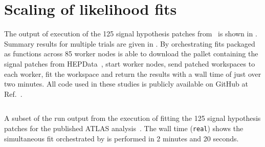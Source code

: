 \section{Scaling of likelihood fits}\label{sec:results}
%
The output of execution of the 125 signal hypothesis patches from~\cite{SUSY-2019-08} is shown in .
Summary results for multiple trials are given in .
By orchestrating \pyhf{} fits packaged as \funcX{} functions across 85 worker nodes \funcX{} is able to download the \pyhf{} pallet containing the signal patches from HEPData~\cite{ATLAS_SUSY_1Lbb_pallet}, start \funcX{} worker nodes, send patched workspaces to each worker, fit the workspace and return the results with a wall time of just over two minutes.
All code used in these studies is publicly available on GitHub at Ref.~\cite{study_code}.
\\

\begin{listing}
 \inputminted{text}{src/code/funcX_demo_output.txt}
 \caption{A subset of the run output from the execution of fitting the 125 signal hypothesis patches for the published ATLAS analysis~\cite{SUSY-2019-08}.
 The wall time (\texttt{real}) shows the simultaneous fit orchestrated by \funcX{} is performed in 2 minutes and 20 seconds.}
 \label{lst:funcX_demo_output}
\end{listing}



